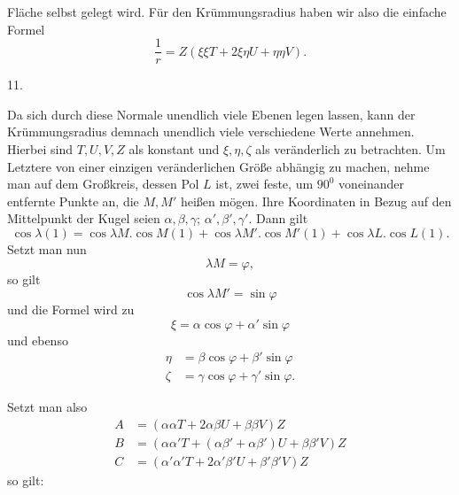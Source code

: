 %
Fläche selbst gelegt wird. Für den Krümmungsradius haben wir also die einfache Formel
\[
\frac1r=Z(\xi\xi T+2\xi\eta U+\eta\eta V).
\]

\begin{center}11.\end{center}
\noindent\hspace*{1.2em}Da sich durch diese Normale unendlich viele Ebenen legen lassen, kann der Krümmungsradius demnach unendlich viele verschiedene Werte annehmen. Hierbei sind $T,U,V,Z$ als konstant und $\xi,\eta,\zeta$ als veränderlich zu betrachten. Um Letztere von einer einzigen veränderlichen Größe abhängig zu machen, nehme man auf dem Großkreis, dessen Pol $L$ ist, zwei feste, um $90^{0}$ voneinander entfernte Punkte an, die $M,M'$ heißen mögen. Ihre Koordinaten in Bezug auf den Mittelpunkt der Kugel seien $\alpha,\beta,\gamma$; $\alpha',\beta',\gamma'$. Dann gilt
\[
\cos\lambda(1)=\cos\lambda M.\cos M(1)+\cos\lambda M'.\cos M'(1)+\cos\lambda L.\cos L(1).
\]
Setzt man nun
\[
\lambda M=\varphi,
\]
so gilt
\[
\cos\lambda M'=\sin\varphi
\]
und die Formel wird zu
\[
\xi=\alpha\cos\varphi+\alpha'\sin\varphi
\]
und ebenso
\[
\begin{aligned}
\eta&=\beta\cos\varphi+\beta'\sin\varphi\\
\zeta&=\gamma\cos\varphi+\gamma'\sin\varphi.
\end{aligned}
\]

Setzt man also
\[
\begin{aligned}
A&=(\alpha\alpha T+2\alpha\beta U+\beta\beta V)Z\\
B&=(\alpha\alpha'T+(\alpha\beta'+\alpha\beta')U+\beta\beta'V)Z\\
C&=(\alpha'\alpha'T+2\alpha'\beta'U+\beta'\beta'V)Z
\end{aligned}
\]
so gilt:

